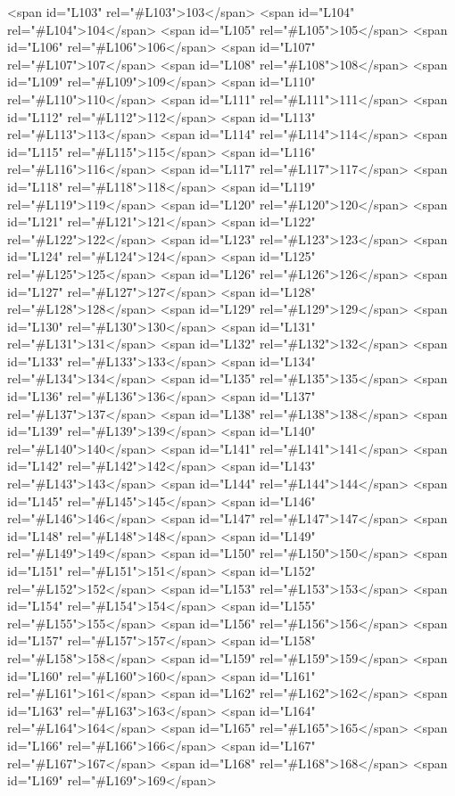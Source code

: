 <span id="L103" rel="#L103">103</span>
<span id="L104" rel="#L104">104</span>
<span id="L105" rel="#L105">105</span>
<span id="L106" rel="#L106">106</span>
<span id="L107" rel="#L107">107</span>
<span id="L108" rel="#L108">108</span>
<span id="L109" rel="#L109">109</span>
<span id="L110" rel="#L110">110</span>
<span id="L111" rel="#L111">111</span>
<span id="L112" rel="#L112">112</span>
<span id="L113" rel="#L113">113</span>
<span id="L114" rel="#L114">114</span>
<span id="L115" rel="#L115">115</span>
<span id="L116" rel="#L116">116</span>
<span id="L117" rel="#L117">117</span>
<span id="L118" rel="#L118">118</span>
<span id="L119" rel="#L119">119</span>
<span id="L120" rel="#L120">120</span>
<span id="L121" rel="#L121">121</span>
<span id="L122" rel="#L122">122</span>
<span id="L123" rel="#L123">123</span>
<span id="L124" rel="#L124">124</span>
<span id="L125" rel="#L125">125</span>
<span id="L126" rel="#L126">126</span>
<span id="L127" rel="#L127">127</span>
<span id="L128" rel="#L128">128</span>
<span id="L129" rel="#L129">129</span>
<span id="L130" rel="#L130">130</span>
<span id="L131" rel="#L131">131</span>
<span id="L132" rel="#L132">132</span>
<span id="L133" rel="#L133">133</span>
<span id="L134" rel="#L134">134</span>
<span id="L135" rel="#L135">135</span>
<span id="L136" rel="#L136">136</span>
<span id="L137" rel="#L137">137</span>
<span id="L138" rel="#L138">138</span>
<span id="L139" rel="#L139">139</span>
<span id="L140" rel="#L140">140</span>
<span id="L141" rel="#L141">141</span>
<span id="L142" rel="#L142">142</span>
<span id="L143" rel="#L143">143</span>
<span id="L144" rel="#L144">144</span>
<span id="L145" rel="#L145">145</span>
<span id="L146" rel="#L146">146</span>
<span id="L147" rel="#L147">147</span>
<span id="L148" rel="#L148">148</span>
<span id="L149" rel="#L149">149</span>
<span id="L150" rel="#L150">150</span>
<span id="L151" rel="#L151">151</span>
<span id="L152" rel="#L152">152</span>
<span id="L153" rel="#L153">153</span>
<span id="L154" rel="#L154">154</span>
<span id="L155" rel="#L155">155</span>
<span id="L156" rel="#L156">156</span>
<span id="L157" rel="#L157">157</span>
<span id="L158" rel="#L158">158</span>
<span id="L159" rel="#L159">159</span>
<span id="L160" rel="#L160">160</span>
<span id="L161" rel="#L161">161</span>
<span id="L162" rel="#L162">162</span>
<span id="L163" rel="#L163">163</span>
<span id="L164" rel="#L164">164</span>
<span id="L165" rel="#L165">165</span>
<span id="L166" rel="#L166">166</span>
<span id="L167" rel="#L167">167</span>
<span id="L168" rel="#L168">168</span>
<span id="L169" rel="#L169">169</span>

